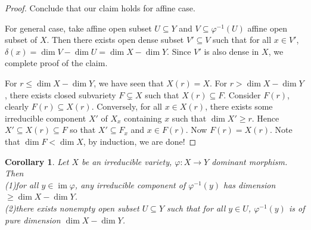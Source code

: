 \documentclass{ctexart}
\newtheorem{corollary}{Corollary}[section]
\newcommand{\im}{\operatorname{im}}
\begin{document}
\begin{proof}
    Conclude that our claim holds for affine case.
    \par
    For general case, take affine open subset $U \subseteq Y$ and $V \subseteq \varphi^{-1}(U)$ affine open subset of $X$.
    Then there exists open dense subset $V' \subseteq V$ such that for all $x\in V'$, $\delta(x) = \dim V - \dim U = \dim X - \dim Y$.
    Since $V'$ is also dense in $X$, we complete proof of the claim.
    \par
    For $r \le \dim X - \dim Y$, we have seen that $X(r) = X$.
    For $r > \dim X - \dim Y$, there exists closed subvariety $F \subsetneq X$ such that $X(r) \subseteq F$.
    Consider $F(r)$, clearly $F(r) \subseteq X(r)$.
    Conversely, for all $x\in X(r)$, there exists some irreducible component $X'$ of $X_{x}$ containing $x$ such that $\dim X' \ge r$.
    Hence $X' \subseteq X(r) \subseteq F$ so that $X' \subseteq F_{x}$ and $x\in F(r)$.
    Now $F(r) = X(r)$.
    Note that $\dim F < \dim X$, by induction, we are done!
\end{proof}
\begin{corollary}
    Let $X$ be an irreducible variety, $\varphi: X \rightarrow Y$ dominant morphism.
    Then \\
    (1)for all $y\in \im \varphi$, any irreducible component of $\varphi^{-1}(y)$ has dimension $\ge \dim X - \dim Y$. \\
    (2)there exists nonempty open subset $U \subseteq Y$ such that for all $y\in U$, $\varphi^{-1}(y)$ is of pure dimension $\dim X - \dim Y$.
    \label{Corollary 4.9}
\end{corollary}
\end{document}
